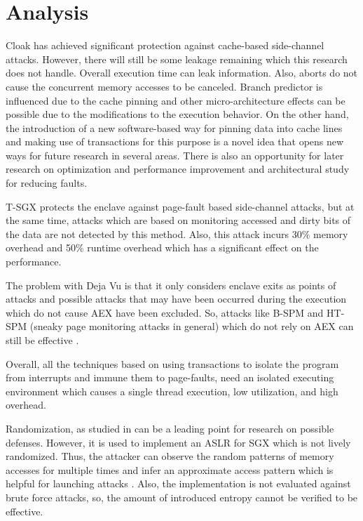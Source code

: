 \section{Analysis}
Cloak \cite{cloak} has achieved significant protection against cache-based side-channel attacks. However, there will still be some leakage remaining which this research does not handle. Overall execution time can leak information. Also, aborts do not cause the concurrent memory accesses to be canceled. Branch predictor is influenced due to the cache pinning and other micro-architecture effects can be possible due to the modifications to the execution behavior. On the other hand, the introduction of a new software-based way for pinning data into cache lines and making use of transactions for this purpose is a novel idea that opens new ways for future research in several areas. There is also an opportunity for later research on optimization and performance improvement and architectural study for reducing faults.

T-SGX \cite{tsgx} protects the enclave against page-fault based side-channel attacks, but at the same time, attacks which are based on monitoring accessed and dirty bits of the data are not detected by this method. Also, this attack incurs 30\% memory overhead and 50\% runtime overhead which has a significant effect on the performance.

The problem with Deja Vu \cite{dejavu} is that it only considers enclave exits as points of attacks and possible attacks that may have been occurred during the execution which do not cause AEX have been excluded. So, attacks like B-SPM and HT-SPM (sneaky page monitoring attacks in general) which do not rely on AEX can still be effective \cite{leakycauldron}.

Overall, all the techniques based on using transactions to isolate the program from interrupts and immune them to page-faults, need an isolated executing environment which causes a single thread execution, low utilization, and high overhead.

Randomization, as studied in \cite{sgxshield} can be a leading point for research on possible defenses. However, it is used to implement an ASLR for SGX which is not lively randomized. Thus, the attacker can observe the random patterns of memory accesses for multiple times and infer an approximate access pattern which is helpful for launching attacks \cite{leakycauldron}. Also, the implementation is not evaluated against brute force attacks, so, the amount of introduced entropy cannot be verified to be effective.

